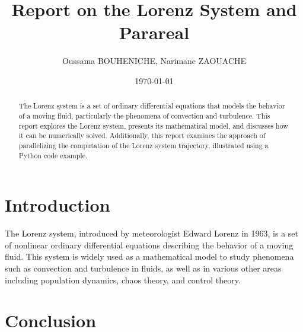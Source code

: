 \documentclass{article}
\title{Report on the Lorenz System and Parareal}
\author{Oussama  BOUHENICHE, 
Narimane ZAOUACHE}
\date{\today}
\begin{document}
\maketitle

\begin{abstract}
The Lorenz system is a set of ordinary differential equations that models the behavior of a moving fluid, 
particularly the phenomena of convection and turbulence. This report explores the Lorenz system, presents its mathematical model, 
and discusses how it can be numerically solved. Additionally, this report examines the approach of parallelizing the computation of the Lorenz system trajectory, 
illustrated using a Python code example.
\end{abstract}

\section{Introduction}
The Lorenz system, introduced by meteorologist Edward Lorenz in 1963, 
is a set of nonlinear ordinary differential equations describing the behavior of a moving fluid. 
This system is widely used as a mathematical model to study phenomena such as convection and turbulence in fluids,
 as well as in various other areas including population dynamics, chaos theory, and control theory.



 



\section{Conclusion}
\end{document}
